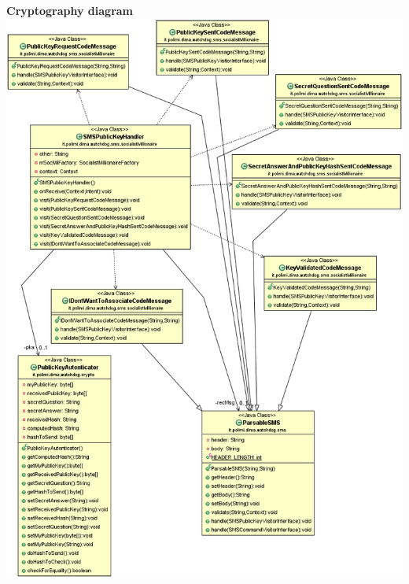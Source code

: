 \begin{center}
\textbf{Cryptography diagram}\\
\includegraphics[scale=0.5]{images/crypto}
\end{center}
\newpage